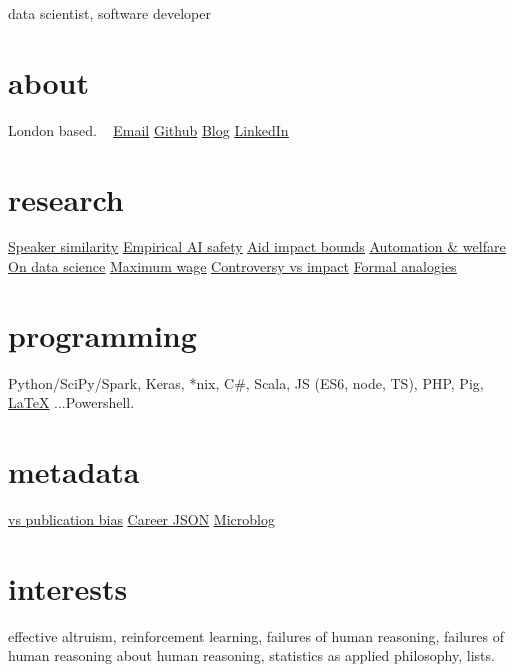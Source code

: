\documentclass[]{friggeri-cv}
\makeatletter
\newcommand{\email}{\underline{\href{mailto:g@gleech.org}{Email}}}%
\newcommand{\linkedIn}{\underline{\href{https://linkedin.com/in/gleech}{LinkedIn}}}%
\newcommand{\github}{\underline{\href{https://github.com/g-leech}{Github}}}%
\newcommand{\newBlog}{\underline{\href{www.gleech.org}{Blog}}}%
\newcommand{\aidImpact}{\underline{\href{https://www.gleech.org/aid}{Aid impact bounds}}}%
\newcommand{\ai}{\underline{\href{https://www.gleech.org/grids/}{Empirical AI safety}}}
\newcommand{\hmms}{\underline{\href{https://www.gleech.org/accommodation}{Speaker similarity}}}%
\newcommand{\analogies}{\underline{\href{https://www.gleech.org/conversion/}{Formal analogies}}}%
\newcommand{\nonvicious}{\underline{\href{https://www.gleech.org/automatic}{Automation \& welfare}}}%
\newcommand{\latex}{\underline{\href{https://www.gleech.org/cv.tex}{LaTeX}}}%
\newcommand{\livingWage}{\underline{\href{https://www.gleech.org/maximum}{Maximum wage}}}%
\newcommand{\dataScience}{\underline{\href{http://gleech.org/data-science}{On data science}}}%
\newcommand{\controversy}{\underline{\href{http://gleech.org/controversy}{Controversy vs impact}}}%
\newcommand{\odyssey}{\underline{\href{https://docs.google.com/spreadsheets/d/1eAe55oEzFhSFB5qNZYMzjSRLcJOW34_DxdAscXSu0AQ/edit?usp=sharing}{vs publication bias}}}%
\newcommand{\json}{\underline{\href{https://github.com/gavin-leech/MachineCV/blob/master/jobs_4_machines.json}{Career JSON}}}%
\newcommand{\iq}{\underline{\href{https://2.bp.blogspot.com/-T72346JIUhk/WKnGhDfOZTI/AAAAAAAAC2Q/08OJLVovi64flXyfz0RsSZ6mNsjSlvUCACLcB/s1600/2017-02-10-153628.jpg}{IQ: 99th percentile}}}
\newcommand{\microblog}{\underline{\href{https://mathstodon.xyz/@gleech/}{Microblog}}}%
\makeatother
\begin{document}
%
       {data scientist, software developer} %
%
\begin{aside}
  \section{about}
    London based.
    ~
    \email{}
    \github{}
    \newBlog{}
    \linkedIn{}
  	~
  	~
  \section{research} 
	\hmms{}
	\ai{}
  	\aidImpact{}
  	\nonvicious{}
    \dataScience{} 
  	\livingWage{}
    \controversy{}
   	\analogies{}
%
  ~
  ~
  \section{programming}
    Python/SciPy/Spark, Keras, *nix, C\#, Scala, JS (ES6, node, TS), PHP, Pig, \latex{} ...Powershell.
  ~
  ~
  \section{metadata}
    \odyssey{}
	\json{}
  	\microblog{}
\end{aside}

\smallskip
\section{interests}

effective altruism, reinforcement learning, failures of human reasoning, failures of human reasoning about human reasoning, statistics as applied philosophy, lists.\\
%
\\
\end{document}
